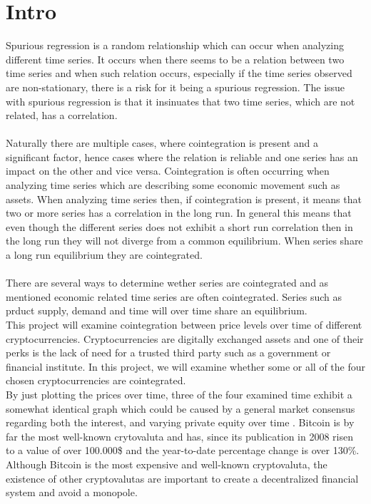 \chapter{Intro}
Spurious regression is a random relationship which can occur when analyzing different time series. It occurs when there seems to be a relation between two time series and when such relation occurs, especially if the time series observed are non-stationary, there is a risk for it being a spurious regression. The issue with spurious regression is that it insinuates that two time series, which are not related, has a correlation.\\\\
\noindent Naturally there are multiple cases, where cointegration is present and a significant factor, hence cases where the relation is reliable and one series has an impact on the other and vice versa. Cointegration is often occurring when analyzing time series which are describing some economic movement such as assets. When analyzing time series then, if cointegration is present, it means that two or more series has a correlation in the long run. In general this means that even though the different series does not exhibit a short run correlation then in the long run they will not diverge from a common equilibrium. When series share a long run equilibrium they are cointegrated.\cite{Intro_cointegration}\\\\
There are several ways to determine wether series are cointegrated and as mentioned economic related time series are often cointegrated. Series such as prduct supply, demand and time will over time share an equilibrium.\\
This project will examine cointegration between price levels over time of different cryptocurrencies. Cryptocurrencies are digitally exchanged assets and one of their perks is the lack of need for a trusted third party such as a government or financial institute. In this project, we will examine whether some or all of the four chosen cryptocurrencies are cointegrated.\\
By just plotting the prices over time, three of the four examined time exhibit a somewhat identical graph which could be caused by a general market consensus regarding both the interest, and varying private equity over time \cite{Coinmarket}. Bitcoin is by far the most well-known crytovaluta and has, since its publication in 2008 risen to a value of over 100.000\$ and the year-to-date percentage change is over 130\%. Although Bitcoin is the most expensive and well-known cryptovaluta, the existence of other cryptovalutas are important to create a decentralized financial system and avoid a monopole.\\
